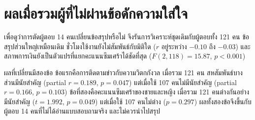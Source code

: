 \section{ผลเมื่อรวมผู้ที่ไม่ผ่านข้อดักความใส่ใจ}
\label{sec:sensitivity}

เพื่อดูว่าการตัดผู้ตอบ 14 คนเปลี่ยนข้อสรุปหรือไม่ จึงรันการวิเคราะห์ชุดเดิมกับผู้ตอบทั้ง 121 คน
ข้อสรุปส่วนใหญ่เหมือนเดิม
ชั่วโมงใช้งานยังไม่สัมพันธ์กับมิติใด ($r$ อยู่ระหว่าง $-0.10$ ถึง $-0.03$)
และสภาพการเงินยังเป็นตัวแปรที่แยกคะแนนซึมเศร้าได้ชัดที่สุด ($F(2, 118) = 15.87$, $p < 0.001$)

ผลที่เปลี่ยนมีสองข้อ ข้อแรกคือการติดตามข่าวกับความวิตกกังวล
เมื่อรวม 121 คน สหสัมพันธ์บางส่วนมีนัยสำคัญ (partial $r = 0.189$, $p = 0.047$)
แต่เมื่อใช้ 107 คนไม่มีนัยสำคัญ (partial $r = 0.166$, $p = 0.103$)
ข้อที่สองคือคะแนนซึมเศร้าของชายและหญิง
เมื่อรวม 121 คนต่างกันอย่างมีนัยสำคัญ ($t = 1.992$, $p = 0.049$)
แต่เมื่อใช้ 107 คนไม่ต่าง ($p = 0.297$)
ผลทั้งสองข้อจึงขึ้นกับผู้ตอบ 14 คนที่ไม่ได้อ่านแบบสอบถามจริง และไม่ควรนำไปสรุป
